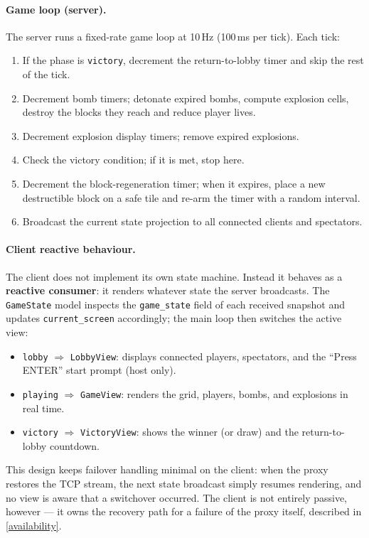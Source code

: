\documentclass{scrartcl}
\begin{document}
\paragraph{Game loop (server).}
The server runs a fixed-rate game loop at 10\,Hz (100\,ms per tick).
Each tick:
\begin{enumerate}
    \item If the phase is \texttt{victory}, decrement the return-to-lobby timer and skip the rest of the tick.
    \item Decrement bomb timers; detonate expired bombs, compute explosion cells, destroy the blocks they reach and reduce player lives.
    \item Decrement explosion display timers; remove expired explosions.
    \item Check the victory condition; if it is met, stop here.
    \item Decrement the block-regeneration timer; when it expires, place a new destructible block on a safe tile and re-arm the timer with a random interval.
    \item Broadcast the current state projection to all connected clients and spectators.
\end{enumerate}

\paragraph{Client reactive behaviour.}
The client does not implement its own state machine.
Instead it behaves as a \textbf{reactive consumer}: it renders whatever state the server broadcasts.
The \texttt{GameState} model inspects the \texttt{game\_state} field of each received snapshot and updates \texttt{current\_screen} accordingly; the main loop then switches the active view:
\begin{itemize}
  \item \texttt{lobby} $\Rightarrow$ \texttt{LobbyView}: displays connected players, spectators, and the ``Press ENTER'' start prompt (host only).
  \item \texttt{playing} $\Rightarrow$ \texttt{GameView}: renders the grid, players, bombs, and explosions in real time.
  \item \texttt{victory} $\Rightarrow$ \texttt{VictoryView}: shows the winner (or draw) and the return-to-lobby countdown.
\end{itemize}
This design keeps failover handling minimal on the client: when the proxy restores the TCP stream, the next state broadcast simply resumes rendering, and no view is aware that a switchover occurred.
The client is not entirely passive, however --- it owns the recovery path for a failure of the proxy itself, described in \cref{availability}.
\end{document}
